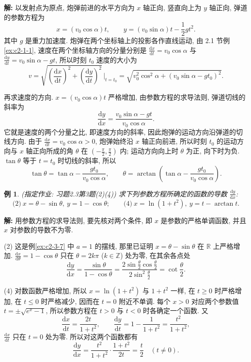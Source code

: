 \documentclass[UTF8,openany]{ctexbook}
\theoremstyle{chinesetextbook}
\newtheorem{example}{例}[section]
\newenvironment{cnsolution}{\par\indent\textbf{解:} \ignorespaces}{\par}
\newcommand{\dd}{\mathrm d}
\begin{document}
\begin{cnsolution}
以发射点为原点, 炮弹前进的水平方向为 $x$ 轴正向, 竖直向上为 $y$ 轴正向, 弹道的参数方程为
\[
x=(v_0\cos\alpha)t,\qquad y=(v_0\sin\alpha)t-\frac12gt^2.
\]
其中 $g$ 是重力加速度. 炮弹在两个坐标轴上的投影各作直线运动, 由 2.1 节例\ref{ex:c2-1-1}, 速度在两个坐标轴方向的分量分别是 $\displaystyle\frac{\dd x}{\dd t}=v_0\cos\alpha$ 与 $\displaystyle\frac{\dd y}{\dd t}=v_0\sin\alpha-gt$, 所以时刻 $t_0$ 速度的大小为
\[
v=\sqrt{\left(\frac{\dd x}{\dd t}\right)^2+\left(\frac{\dd y}{\dd t}\right)^2}\,\Bigg|_{t=t_0}=\sqrt{v_0^2\cos^2\alpha+(v_0\sin\alpha-gt_0)^2}.
\]

再求速度的方向. $x=(v_0\cos\alpha)t$ 严格增加, 由参数方程的求导法则, 弹道切线的斜率为
\[
\frac{\dd y}{\dd x}=\frac{v_0\sin\alpha-gt}{v_0\cos\alpha}.
\]
它就是速度的两个分量之比, 即速度方向的斜率, 因此炮弹的运动方向沿弹道的切线方向. 由于 $\displaystyle\frac{\dd x}{\dd t}=v_0\cos\alpha>0$, 炮弹始终沿 $x$ 轴正向前进, 所以时刻 $t_0$ 的运动方向与 $x$ 轴正向所成的角 $\theta$ 在 $\displaystyle\left(-\frac\pi2,\frac\pi2\right)$ 内; 运动方向向上时 $\theta$ 为正, 向下时为负. $\tan\theta$ 等于 $t=t_0$ 时切线的斜率, 所以
\[
\tan\theta=\tan\alpha-\frac{gt_0}{v_0\cos\alpha},\qquad\theta=\arctan\left(\tan\alpha-\frac{gt_0}{v_0\cos\alpha}\right).
\]

\end{cnsolution}
\begin{example}\label{ex:c2-h3-3}
\textnormal{(指定作业: 习题2.3第3题(2)(4))} 求下列参数方程所确定的函数的导数 $\displaystyle\frac{\dd y}{\dd x}$:
\[
\text{(2)}\ x=\theta-\sin\theta,\ y=1-\cos\theta;\qquad\text{(4)}\ x=\ln(1+t^2),\ y=t-\arctan t.
\]
\end{example}
\begin{cnsolution}
用参数方程的求导法则, 要先核对两个条件, 即 $x$ 是参数的严格单调函数, 并且 $x$ 对参数的导数不为零.

(2) 这是例\ref{ex:c2-3-7} 中 $a=1$ 的摆线, 那里已证明 $x=\theta-\sin\theta$ 在 $\mathbb R$ 上严格增加. $\displaystyle\frac{\dd x}{\dd\theta}=1-\cos\theta$ 只在 $\theta=2k\pi$ ($k\in\mathbb Z$) 处为零, 在其余各点处
\[
\frac{\dd y}{\dd x}=\frac{\sin\theta}{1-\cos\theta}=\frac{2\sin\frac\theta2\cos\frac\theta2}{2\sin^2\frac\theta2}=\cot\frac\theta2.
\]

(4) 对数函数严格增加, 所以 $x=\ln(1+t^2)$ 与 $1+t^2$ 一样, 在 $t\ge0$ 时严格增加, 在 $t\le0$ 时严格减少, 因而在 $t=0$ 附近不单调. 每个 $x>0$ 对应两个参数值 $t=\pm\sqrt{e^x-1}$, 所以参数方程在 $t>0$ 与 $t<0$ 时各确定一个函数. 又
\[
\frac{\dd x}{\dd t}=\frac{2t}{1+t^2},\qquad\frac{\dd y}{\dd t}=1-\frac1{1+t^2}=\frac{t^2}{1+t^2},
\]
$\displaystyle\frac{\dd x}{\dd t}$ 只在 $t=0$ 处为零. 所以对这两个函数都有
\[
\frac{\dd y}{\dd x}=\frac{t^2}{1+t^2}\cdot\frac{1+t^2}{2t}=\frac t2\quad(t\ne0).
\]
\end{cnsolution}
\end{document}
